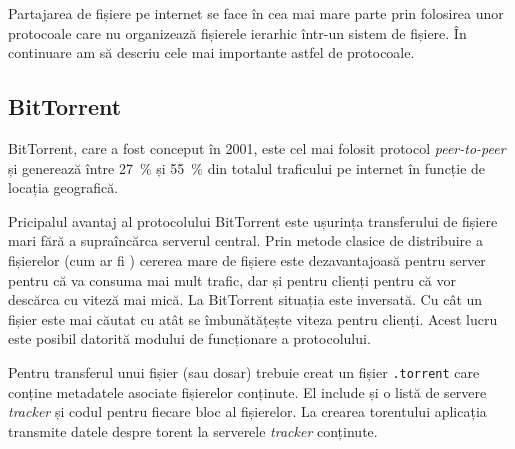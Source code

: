 \documentclass[a4wide,12pt]{report}
\newcommand{\eng}[1]{\emph{#1}} %
\newcommand{\cod}[1]{\texttt{#1}}
\newcommand{\acr}[1]{{\textsmaller[1]{\textsc{#1}}}} %
\begin{document}
Partajarea de fișiere pe internet se face în cea mai mare parte prin folosirea unor protocoale care nu organizează
fișierele ierarhic într-un sistem de fișiere. În continuare am să descriu cele mai importante astfel de protocoale.

\subsection{BitTorrent} %

BitTorrent, care a fost conceput în 2001, este cel mai folosit protocol \eng{peer-to-peer} și generează între 27~\% și
55~\% din totalul traficului pe internet în funcție de locația geografică\cite{proctf}.

Pricipalul avantaj al protocolului BitTorrent este ușurința transferului de fișiere mari fără a supraîncărca serverul
central. Prin metode clasice de distribuire a fișierelor (cum ar fi \acr{FTP}) cererea mare de fișiere este
dezavantajoasă pentru server pentru că va consuma mai mult trafic, dar și pentru clienți pentru că vor descărca cu
viteză mai mică. La BitTorrent situația este inversată. Cu cât un fișier este mai căutat cu atât se îmbunătățește viteza
pentru clienți.  Acest lucru este posibil datorită modului de funcționare a protocolului.

Pentru transferul unui fișier (sau dosar) trebuie creat un fișier \cod{.torrent} care conține metadatele asociate
fișierelor conținute.\cite{wikitorr} El include și o listă de servere \eng{tracker} și codul \acr{SHA-1} pentru fiecare
bloc al fișierelor. La crearea torentului aplicația transmite datele despre torent la serverele \eng{tracker}
conținute.
\end{document}
